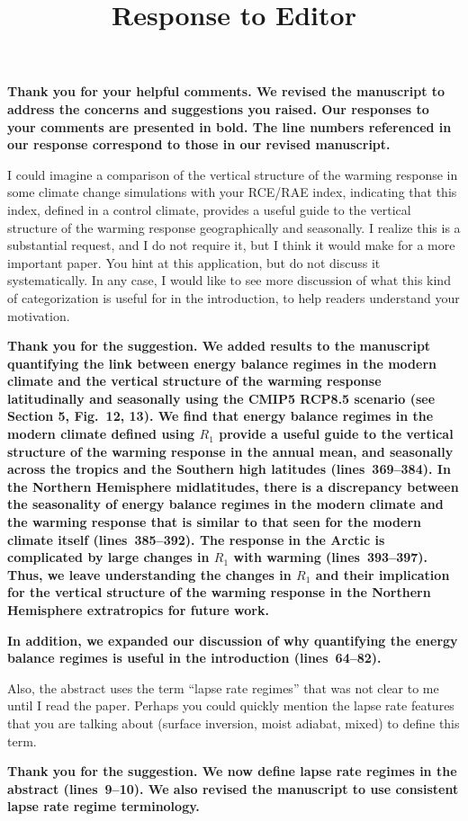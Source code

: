 \documentclass{article}
\title{\vspace{-2.5cm}Response to Editor\vspace{-2cm}}
\date{}
\author{}
\begin{document}
\maketitle

\textbf{Thank you for your helpful comments. We revised the manuscript to address the concerns and suggestions you raised. Our responses to your comments are presented in bold. The line numbers referenced in our response correspond to those in our revised manuscript.}

I could imagine a comparison of the vertical structure of the warming response in some climate change simulations with your RCE/RAE index, indicating that this index, defined in a control climate, provides a useful guide to the vertical structure of the warming response geographically and seasonally.  I realize this is a substantial request, and I do not require it, but I think it would make for a more important paper.  You hint at this application, but do not discuss it systematically.  In any case, I would like to see more discussion of what this kind of categorization is useful for in the introduction, to help readers understand your motivation. 

\textbf{Thank you for the suggestion. We added results to the manuscript quantifying the link between energy balance regimes in the modern climate and the vertical structure of the warming response latitudinally and seasonally using the CMIP5 RCP8.5 scenario (see Section 5, Fig.~12, 13). We find that energy balance regimes in the modern climate defined using $R_1$ provide a useful guide to the vertical structure of the warming response in the annual mean, and seasonally across the tropics and the Southern high latitudes (lines~369--384). In the Northern Hemisphere midlatitudes, there is a discrepancy between the seasonality of energy balance regimes in the modern climate and the warming response that is similar to that seen for the modern climate itself (lines~385--392). The response in the Arctic is complicated by large changes in $R_1$ with warming (lines~393--397). Thus, we leave understanding the changes in $R_1$ and their implication for the vertical structure of the warming response in the Northern Hemisphere extratropics for future work.} 

\textbf{In addition, we expanded our discussion of why quantifying the energy balance regimes is useful in the introduction (lines~64--82).}

Also, the abstract uses the term ``lapse rate regimes'' that was not clear to me until I read the paper.  Perhaps you could quickly mention the lapse rate features that you are talking about (surface inversion, moist adiabat, mixed) to define this term.

\textbf{Thank you for the suggestion. We now define lapse rate regimes in the abstract (lines~9--10). We also revised the manuscript to use consistent lapse rate regime terminology.}

% 
% 
\end{document}
